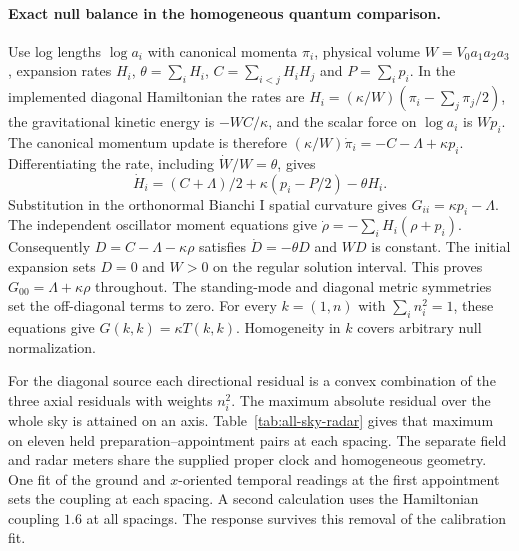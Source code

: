\documentclass[11pt]{article}
\begin{document}
\paragraph{Exact null balance in the homogeneous quantum comparison.}
\label{par:canonical-all-null}
Use log lengths $\log a_i$ with canonical momenta $\pi_i$, physical
volume $W=V_0 a_1a_2a_3$, expansion rates $H_i$, $\theta=\sum_i H_i$,
$C=\sum_{i<j}H_iH_j$ and $P=\sum_i p_i$. In the implemented diagonal
Hamiltonian the rates are $H_i=(\kappa/W)(\pi_i-\sum_j\pi_j/2)$, the
gravitational kinetic energy is $-WC/\kappa$, and the scalar force on
$\log a_i$ is $W p_i$. The canonical momentum update is therefore
$(\kappa/W)\dot\pi_i=-C-\Lambda+\kappa p_i$. Differentiating the rate,
including $\dot W/W=\theta$, gives
\[
 \dot H_i=(C+\Lambda)/2+\kappa(p_i-P/2)-\theta H_i .
\]
Substitution in the orthonormal Bianchi I spatial curvature gives
$G_{ii}=\kappa p_i-\Lambda$. The independent oscillator moment
equations give $\dot\rho=-\sum_i H_i(\rho+p_i)$. Consequently
$D=C-\Lambda-\kappa\rho$ satisfies $\dot D=-\theta D$ and $WD$ is
constant. The initial expansion sets $D=0$ and $W>0$ on the regular
solution interval. This proves $G_{00}=\Lambda+\kappa\rho$ throughout.
The standing-mode and diagonal metric symmetries set the off-diagonal
terms to zero. For every $k=(1,n)$ with $\sum_i n_i^2=1$, these
equations give $G(k,k)=\kappa T(k,k)$. Homogeneity in $k$ covers
arbitrary null normalization.

For the diagonal source each directional residual is a convex combination
of the three axial residuals with weights $n_i^2$. The maximum absolute
residual over the whole sky is attained on an axis. Table~\ref{tab:all-sky-radar}
gives that maximum on eleven held preparation--appointment pairs at each
spacing. The separate field and radar meters share the supplied proper
clock and homogeneous geometry. One fit of the ground and $x$-oriented
temporal readings at the first appointment sets the coupling at each
spacing. A second calculation uses the Hamiltonian coupling $1.6$ at
all spacings. The response survives this removal of the calibration fit.
\end{document}
